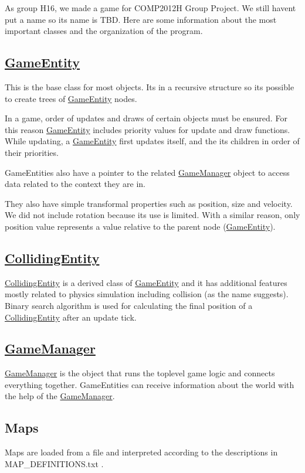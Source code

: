 As group H16, we made a game for C\+O\+M\+P2012H Group Project. We still haven\textquotesingle{}t put a name so its name is T\+BD. Here are some information about the most important classes and the organization of the program.

\subsection*{\mbox{\hyperlink{class_game_entity}{Game\+Entity}}}

This is the base class for most objects. It\textquotesingle{}s in a recursive structure so it\textquotesingle{}s possible to create trees of \mbox{\hyperlink{class_game_entity}{Game\+Entity}} nodes.

In a game, order of updates and draws of certain objects must be ensured. For this reason \mbox{\hyperlink{class_game_entity}{Game\+Entity}} includes priority values for update and draw functions. While updating, a \mbox{\hyperlink{class_game_entity}{Game\+Entity}} first updates itself, and the its children in order of their priorities.

Game\+Entities also have a pointer to the related \mbox{\hyperlink{class_game_manager}{Game\+Manager}} object to access data related to the context they are in.

They also have simple transformal properties such as position, size and velocity. We did not include rotation because it\textquotesingle{}s use is limited. With a similar reason, only position value represents a value relative to the parent node (\mbox{\hyperlink{class_game_entity}{Game\+Entity}}).

\subsection*{\mbox{\hyperlink{class_colliding_entity}{Colliding\+Entity}}}

\mbox{\hyperlink{class_colliding_entity}{Colliding\+Entity}} is a derived class of \mbox{\hyperlink{class_game_entity}{Game\+Entity}} and it has additional features mostly related to physics simulation including collision (as the name suggests). Binary search algorithm is used for calculating the final position of a \mbox{\hyperlink{class_colliding_entity}{Colliding\+Entity}} after an update tick.

\subsection*{\mbox{\hyperlink{class_game_manager}{Game\+Manager}}}

\mbox{\hyperlink{class_game_manager}{Game\+Manager}} is the object that runs the toplevel game logic and connects everything together. Game\+Entities can receive information about the world with the help of the \mbox{\hyperlink{class_game_manager}{Game\+Manager}}.

\subsection*{Maps}

Maps are loaded from a file and interpreted according to the descriptions in M\+A\+P\+\_\+\+D\+E\+F\+I\+N\+I\+T\+I\+O\+N\+S.\+txt . 